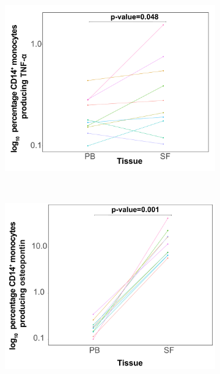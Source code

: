 \bigskip
\begin{figure}[H]
\centering
\begin{subfigure}[b]{0.40\textwidth}
\centering 
\includegraphics[width=\textwidth]{./Results3/pdfs/CyTOF_validation_cohort_TNFa_percentage_log10_scale}%
\caption{}
\end{subfigure}%
~
\begin{subfigure}[b]{0.40\textwidth}
\centering 
\includegraphics[width=\textwidth]{./Results3/pdfs/CyTOF_validation_cohort_osteopontin_percentage_log10_scale}
\caption{}
\end{subfigure}
~
\begin{subfigure}[b]{0.40\textwidth} 

\end{subfigure}
\end{figure}
